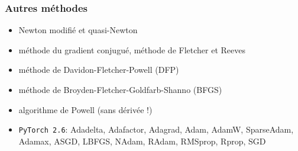\begin{frame}
  \frametitle{Autres méthodes}

  \begin{itemize}
  \item Newton modifié et quasi-Newton
  \item méthode du gradient conjugué, méthode de Fletcher et Reeves
  \item méthode de Davidon-Fletcher-Powell (DFP)
  \item méthode de Broyden-Fletcher-Goldfarb-Shanno (BFGS)
  \item algorithme de Powell (sans dérivée !)
  \item \verb!PyTorch 2.6!: Adadelta, Adafactor, Adagrad,
    Adam, AdamW, SparseAdam, Adamax, ASGD, LBFGS, NAdam,
    RAdam, RMSprop, Rprop, SGD
  \end{itemize}
  
\end{frame}





  
  
